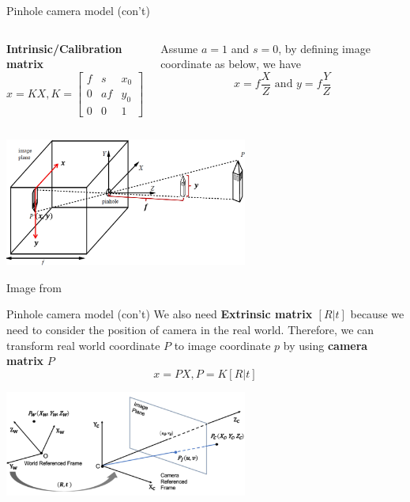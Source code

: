 \documentclass{beamer}
\begin{document}
\begin{frame}{Pinhole camera model (con't)}
    \begin{columns}
        \textbf{Intrinsic/Calibration matrix}
        $$x=KX, K=\begin{bmatrix}
        f & s & x_0\\
        0 & af & y_0\\
        0 & 0 & 1
        \end{bmatrix}$$
        
        Assume $a=1$ and $s=0$, by defining image coordinate as below, we have
        $$x=f\frac{X}{Z} \text{ and } y=f\frac{Y}{Z}$$
    \end{columns}
    \smallskip
    \begin{center}
        \includegraphics[width=8cm]{pinhole_derive.jpg}
        \par Image from \cite{noauthor_cs280:_nodate}
    \end{center}
\end{frame}

\begin{frame}{Pinhole camera model (con't)}
    We also need \textbf{Extrinsic matrix $[R \lvert t]$} because we need to consider the position of camera in the real world. Therefore, we can transform real world coordinate $P$ to image coordinate $p$ by using \textbf{camera matrix} $P$
    $$x=PX, P=K[R\lvert t]$$
    \begin{center}
        \includegraphics[width=8cm]{pinhole_extrinsic.jpg}
    \end{center}
\end{frame}
\end{document}
